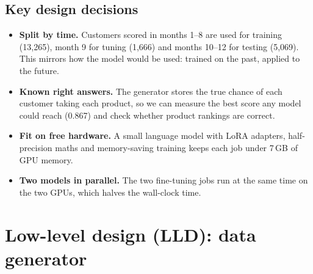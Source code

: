 \documentclass[10pt,a4paper]{article}
\begin{document}
\subsection{Key design decisions}
\begin{itemize}
\item \textbf{Split by time.} Customers scored in months 1--8 are used for training (13,265), month 9 for tuning (1,666) and months 10--12 for testing (5,069). This mirrors how the model would be used: trained on the past, applied to the future.
\item \textbf{Known right answers.} The generator stores the true chance of each customer taking each product, so we can measure the best score any model could reach (0.867) and check whether product rankings are correct.
\item \textbf{Fit on free hardware.} A small language model with LoRA adapters, half-precision maths and memory-saving training keeps each job under 7\,GB of GPU memory.
\item \textbf{Two models in parallel.} The two fine-tuning jobs run at the same time on the two GPUs, which halves the wall-clock time.
\end{itemize}

\section{Low-level design (LLD): data generator}
\end{document}
